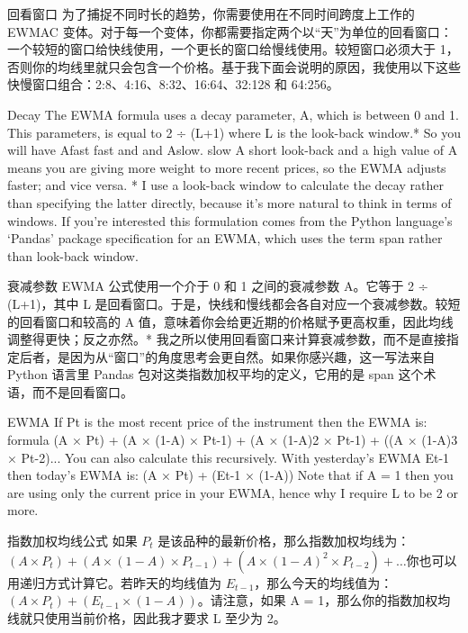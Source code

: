 \begin{chineseblock}回看窗口 为了捕捉不同时长的趋势，你需要使用在不同时间跨度上工作的 EWMAC 变体。对于每一个变体，你都需要指定两个以“天”为单位的回看窗口：一个较短的窗口给快线使用，一个更长的窗口给慢线使用。较短窗口必须大于 1，否则你的均线里就只会包含一个价格。基于我下面会说明的原因，我使用以下这些快慢窗口组合：2:8、4:16、8:32、16:64、32:128 和 64:256。 \end{chineseblock}

\bipairgap

\begin{englishblock} Decay The EWMA formula uses a decay parameter, A, which is between 0 and 1. This parameters, is equal to 2 ÷ (L+1) where L is the look-back window.* So you will have Afast fast and and Aslow. slow A short look-back and a high value of A means you are giving more weight to more recent prices, so the EWMA adjusts faster; and vice versa. * I use a look-back window to calculate the decay rather than specifying the latter directly, because it's more natural to think in terms of windows. If you're interested this formulation comes from the Python language's ‘Pandas' package specification for an EWMA, which uses the term span rather than look-back window. \end{englishblock}

\begin{chineseblock}衰减参数 EWMA 公式使用一个介于 0 和 1 之间的衰减参数 A。它等于 2 ÷ (L+1)，其中 L 是回看窗口。于是，快线和慢线都会各自对应一个衰减参数。较短的回看窗口和较高的 A 值，意味着你会给更近期的价格赋予更高权重，因此均线调整得更快；反之亦然。* 我之所以使用回看窗口来计算衰减参数，而不是直接指定后者，是因为从“窗口”的角度思考会更自然。如果你感兴趣，这一写法来自 Python 语言里 Pandas 包对这类指数加权平均的定义，它用的是 span 这个术语，而不是回看窗口。\end{chineseblock}

\bipairgap

\begin{englishblock} EWMA If Pt is the most recent price of the instrument then the EWMA is: formula (A × Pt) + (A × (1-A) × Pt-1) + (A × (1-A)2 × Pt-1) + ((A × (1-A)3 × Pt-2)... You can also calculate this recursively. With yesterday's EWMA Et-1 then today's EWMA is: (A × Pt) + (Et-1 × (1-A)) Note that if A = 1 then you are using only the current price in your EWMA, hence why I require L to be 2 or more. \end{englishblock}

\begin{chineseblock}指数加权均线公式 如果 \(P_t\) 是该品种的最新价格，那么指数加权均线为：\( (A \times P_t) + (A \times (1-A) \times P_{t-1}) + (A \times (1-A)^2 \times P_{t-2}) + \dots \)你也可以用递归方式计算它。若昨天的均线值为 \(E_{t-1}\)，那么今天的均线值为：\( (A \times P_t) + (E_{t-1} \times (1-A)) \)。请注意，如果 A = 1，那么你的指数加权均线就只使用当前价格，因此我才要求 L 至少为 2。 \end{chineseblock}

